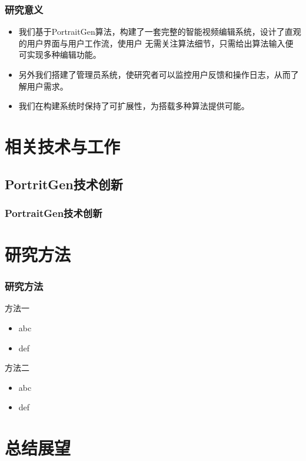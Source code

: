 \documentclass[aspectratio=169]{ctexbeamer}
\begin{document}
\begin{frame}
  \frametitle{研究意义}
  \begin{itemize}
    \item 我们基于PortraitGen算法，构建了一套完整的智能视频编辑系统，设计了直观的用户界面与用户工作流，使用户
    无需关注算法细节，只需给出算法输入便可实现多种编辑功能。
    \item 另外我们搭建了管理员系统，使研究者可以监控用户反馈和操作日志，从而了解用户需求。
    \item 我们在构建系统时保持了可扩展性，为搭载多种算法提供可能。
  \end{itemize}

\end{frame}

\section{相关技术与工作}
\subsection{PortritGen技术创新}
\begin{frame}
  \frametitle{PortraitGen技术创新}
  
\end{frame}

\section{研究方法}

\begin{frame}
  \frametitle{研究方法}
  \begin{block}{方法一}
    \begin{itemize}
      \item abc
      \item def
    \end{itemize}
  \end{block}
  \pause
  \begin{block}{方法二}
    \begin{itemize}
      \item abc
      \item def
    \end{itemize}
  \end{block}
\end{frame}


\section{总结展望}
\end{document}
